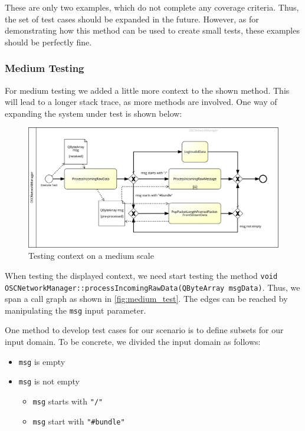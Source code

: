 \documentclass{scrreprt}
\begin{document}
These are only two examples, which do not complete any coverage criteria. Thus, the set of test cases should be expanded in the future. However, as for demonstrating how this method can be used to create small tests, these examples should be perfectly fine.

\subsubsection{Medium Testing}

For medium testing we added a little more context to the shown method. This will lead to a longer stack trace, as more methods are involved. One way of expanding the system under test is shown below:

\begin{figure}[h]
	\centering
	\includegraphics[width=1.1\textwidth]{img/2_1_3_medium_test}
	\caption[Medium Testing Context]{Testing context on a medium scale}
	\label{fig:medium_test}
\end{figure}

When testing the displayed context, we need start testing the method \texttt{void OSCNetworkManager::processIncomingRawData(QByteArray msgData)}. Thus, we span a call graph as shown in \vref{fig:medium_test}. The edges can be reached by manipulating the \texttt{msg} input parameter.

One method to develop test cases for our scenario is to define subsets for our input domain. To be concrete, we divided the input domain as follows:

\begin{itemize}
	\item \texttt{msg} is empty
	\item \texttt{msg} is not empty
	
	\begin{itemize}
		\item \texttt{msg} starts with \texttt{"/"}
		\item \texttt{msg} start with \texttt{"\#bundle"}
	\end{itemize}
\end{itemize}
\end{document}
